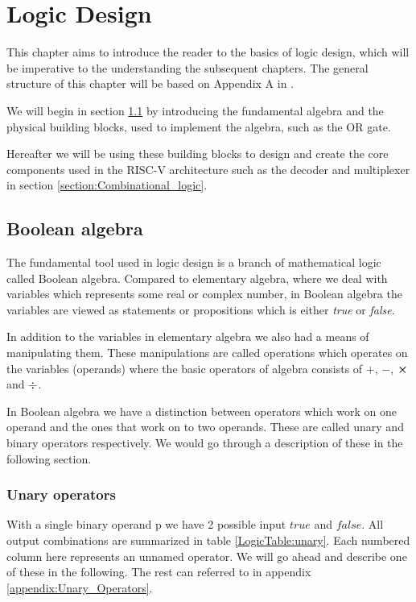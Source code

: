 \chapter{Logic Design}
    
    This chapter aims to introduce the reader to the basics of logic design, which will be imperative to the understanding the subsequent chapters. The general structure of this chapter will be based on Appendix A in \cite{riscVbook}. 
    
    We will begin in section \ref{section:Boolean_algebra} by introducing the fundamental algebra and the physical building blocks, used to implement the algebra, such as the OR gate. 
    
    Hereafter we will be using these building blocks to design and create the core components used in the RISC-V architecture such as the decoder and multiplexer in section \ref{section:Combinational_logic}. 

    \section{Boolean algebra}\label{section:Boolean_algebra}
    
        The fundamental tool used in logic design is a branch of mathematical logic called Boolean algebra. Compared to elementary algebra, where we deal with variables which represents some real or complex number, in Boolean algebra the variables are viewed as statements or propositions which is either \textit{true} or \textit{false}.
        
        In addition to the variables in elementary algebra we also had a means of manipulating them. These manipulations are called operations which operates on the variables (operands) where the basic operators of algebra consists of $+$, $-$, $\cross$ and $\divisionsymbol$.
        
        In Boolean algebra we have a distinction between operators which work on one operand and the ones that work on to two operands. These are called unary and binary operators respectively. We would go through a description of these in the following section. 
        
        \subsection{Unary operators}
            With a single binary operand p we have 2 possible input $true$ and $false$. All output combinations are summarized in table \ref{LogicTable:unary}. Each numbered column here represents an unnamed operator. We will go ahead and describe one of these in the following. The rest can referred to in appendix \ref{appendix:Unary_Operators}. 
            
